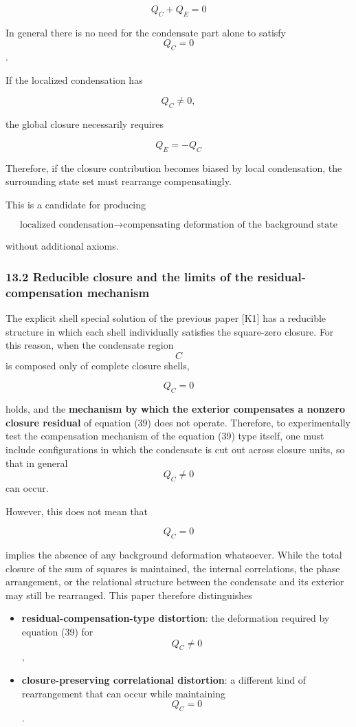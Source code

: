 \documentclass[
  a4paper,
]{article}
\providecommand{\tightlist}{%
  \setlength{\itemsep}{0pt}\setlength{\parskip}{0pt}}
\begin{document}
\[
\boxed{
Q_C+Q_E=0
}
\tag{38}
\]

In general there is no need for the condensate part alone to satisfy
\[Q_C=0\].

If the localized condensation has

\[
Q_C\neq0,
\]

the global closure necessarily requires

\[
\boxed{
Q_E=-Q_C
}
\tag{39}
\]

Therefore, if the closure contribution becomes biased by local
condensation, the surrounding state set must rearrange compensatingly.

This is a candidate for producing

\[
\boxed{
\text{localized condensation}
\longrightarrow
\text{compensating deformation of the background state}
}
\]

without additional axioms.

\subsubsection{13.2 Reducible closure and the limits of the
residual-compensation
mechanism}\label{reducible-closure-and-the-limits-of-the-residual-compensation-mechanism}

The explicit shell special solution of the previous paper {[}K1{]} has a
reducible structure in which each shell individually satisfies the
square-zero closure. For this reason, when the condensate region \[C\]
is composed only of complete closure shells,

\[
Q_C=0
\]

holds, and the \textbf{mechanism by which the exterior compensates a
nonzero closure residual} of equation (39) does not operate. Therefore,
to experimentally test the compensation mechanism of the equation (39)
type itself, one must include configurations in which the condensate is
cut out across closure units, so that in general \[Q_C\neq0\] can occur.

However, this does not mean that

\[
Q_C=0
\]

implies the absence of any background deformation whatsoever. While the
total closure of the sum of squares is maintained, the internal
correlations, the phase arrangement, or the relational structure between
the condensate and its exterior may still be rearranged. This paper
therefore distinguishes

\begin{itemize}
\tightlist
\item
  \textbf{residual-compensation-type distortion}: the deformation
  required by equation (39) for \[Q_C\neq0\],
\item
  \textbf{closure-preserving correlational distortion}: a different kind
  of rearrangement that can occur while maintaining \[Q_C=0\].
\end{itemize}
\end{document}
